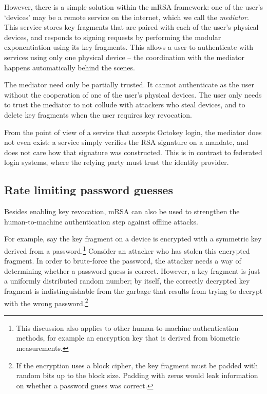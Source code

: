 However, there is a simple solution within the mRSA framework: one of the user's `devices' may be a
remote service on the internet, which we call the \emph{mediator}. This service stores key fragments
that are paired with each of the user's physical devices, and responds to signing requests by
performing the modular exponentiation using its key fragments. This allows a user to authenticate
with services using only one physical device -- the coordination with the mediator happens
automatically behind the scenes.

The mediator need only be partially trusted. It cannot authenticate as the user without the
cooperation of one of the user's physical devices. The user only needs to trust the mediator to not
collude with attackers who steal devices, and to delete key fragments when the user requires key
revocation.

From the point of view of a service that accepts Octokey login, the mediator does not even exist: a
service simply verifies the RSA signature on a mandate, and does not care how that signature was
constructed. This is in contrast to federated login systems, where the relying party must trust the
identity provider.

\subsection{Rate limiting password guesses}\label{sec:ratelimit}

Besides enabling key revocation, mRSA can also be used to strengthen the human-to-machine
authentication step against offline attacks.

For example, say the key fragment on a device is encrypted with a symmetric key derived from a
password.\footnote{This discussion also applies to other human-to-machine authentication methods,
for example an encryption key that is derived from biometric measurements.} Consider an attacker who
has stolen this encrypted fragment. In order to brute-force the password, the attacker needs a way
of determining whether a password guess is correct. However, a key fragment is just a uniformly
distributed random number; by itself, the correctly decrypted key fragment is indistinguishable from
the garbage that results from trying to decrypt with the wrong password.\footnote{If the encryption
uses a block cipher, the key fragment must be padded with random bits up to the block size. Padding
with zeros would leak information on whether a password guess was correct.}

